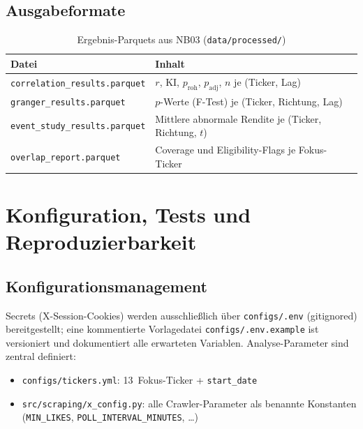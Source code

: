 \documentclass[11pt, a4paper]{article}
\begin{document}
\subsection{Ausgabeformate}

\begin{table}[H]
\centering
\caption{Ergebnis-Parquets aus NB03 (\texttt{data/processed/})}
\begin{tabular}{ll}
\toprule
\textbf{Datei} & \textbf{Inhalt} \\
\midrule
\texttt{correlation\_results.parquet}  &
  $r$, KI, $p_{\mathrm{roh}}$, $p_{\mathrm{adj}}$, $n$ je (Ticker, Lag) \\
\texttt{granger\_results.parquet}      &
  $p$-Werte (F-Test) je (Ticker, Richtung, Lag) \\
\texttt{event\_study\_results.parquet} &
  Mittlere abnormale Rendite je (Ticker, Richtung, $t$) \\
\texttt{overlap\_report.parquet}       &
  Coverage und Eligibility-Flags je Fokus-Ticker \\
\bottomrule
\end{tabular}
\end{table}

\section{Konfiguration, Tests und Reproduzierbarkeit}
\label{sec:konfiguration}

\subsection{Konfigurationsmanagement}

Secrets (X-Session-Cookies) werden ausschließlich über
\texttt{configs/.env} (gitignored) bereitgestellt; eine kommentierte
Vorlagedatei \texttt{configs/.env.example} ist versioniert und dokumentiert
alle erwarteten Variablen. Analyse-Parameter sind zentral definiert:

\begin{itemize}[noitemsep]
  \item \texttt{configs/tickers.yml}: 13~Fokus-Ticker + \texttt{start\_date}
  \item \texttt{src/scraping/x\_config.py}: alle Crawler-Parameter als
        benannte Konstanten (\texttt{MIN\_LIKES}, \texttt{POLL\_INTERVAL\_MINUTES}, \ldots)
\end{itemize}
\end{document}
